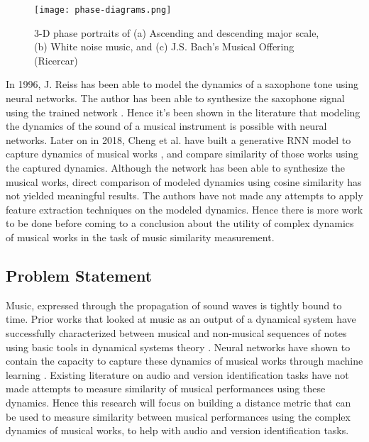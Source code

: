 \documentclass[../main.tex]{subfiles}
\begin{document}
\begin{figure}[h]
    \centering
    \texttt{[image: phase-diagrams.png]}
    \caption{3-D phase portraits of (a) Ascending and descending major scale, (b) White noise music, and (c) J.S. Bach's Musical Offering (Ricercar)}
    \label{fig:phase-diagrams}
\end{figure}

\par
In 1996, J. Reiss has been able to model the dynamics of a saxophone tone using neural networks. The author has been able to synthesize the saxophone signal using the trained network \cite{robelNeuralNetworkModeling1997}. Hence it's been shown in the literature that modeling the dynamics of the sound of a musical instrument is possible with neural networks. Later on in 2018, Cheng et al. have built a generative \gls{RNN} model to capture dynamics of musical works  \cite{tian_cheng_comparing_2018}, and compare similarity of those works using the captured dynamics. Although the network has been able to synthesize the musical works, direct comparison of modeled dynamics using cosine similarity has not yielded meaningful results. The authors have not made any attempts to apply feature extraction techniques on the modeled dynamics. Hence there is more work to be done before coming to a conclusion about the utility of complex dynamics of musical works in the task of music similarity measurement.


\subsection{Problem Statement}

\par
Music, expressed through the propagation of sound waves is tightly bound to time. Prior works that looked at music as an output of a dynamical system have successfully characterized between musical and non-musical sequences of notes using basic tools in dynamical systems theory \cite{complex_dynamics}. Neural networks have shown to contain the capacity to capture these dynamics of musical works through machine learning \cite{robelNeuralNetworkModeling1997,dynamic_process_modeling_with_rnn}. Existing literature on audio and version identification tasks have not made attempts to measure similarity of musical performances using these dynamics. Hence this research will focus on building a distance metric that can be used to measure similarity between musical performances using the complex dynamics of musical works, to help with audio and version identification tasks.
\end{document}

